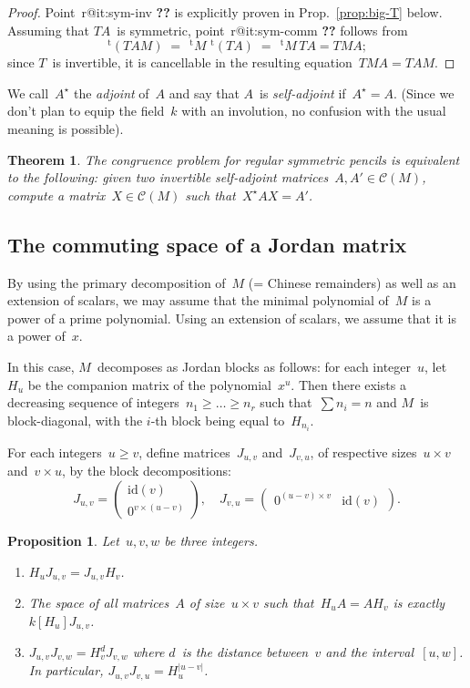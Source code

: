 \documentclass{article}%
\makeatletter
\newtheorem{prop}{Proposition}
\newtheorem{thm}{Theorem}
\def\labelenumi{(\roman{enumi})}
\def\itemref#1{\expandafter\ifx\csname r@#1\endcsname\relax
  {\bfseries ??}\else{\setcounter{enumi}{\ref{#1}}\labelenumi}\fi}
\let\ro\mathscr
\def\transpose{\,{}^{\mathrm{t}\!}}
\def\abs#1{\left|#1\right|}
\def\mat#1{\begin{pmatrix}#1\end{pmatrix}}
\makeatother
\begin{document}
\begin{proof}
Point~\itemref{it:sym-inv} is explicitly proven in Prop.~\ref{prop:big-T}
below. Assuming that $TA$~is symmetric, point~\itemref{it:sym-comm}
follows from
\begin{equation}
\transpose{(TAM)} \;=\; \transpose{M}\, \transpose{(TA)}
 \;=\; \transpose{M}\,TA = TMA;
\end{equation}
since $T$~is invertible, it is cancellable in the resulting equation~$TMA
= TAM$.
\end{proof}

We call~$A^{⋆}$ the \emph{adjoint} of~$A$ and say that $A$~is
\emph{self-adjoint} if~$A^{⋆} = A$. (Since we don't plan to equip the
field~$k$ with an involution, no confusion with the usual meaning is
possible).

\begin{thm}\label{thm:IP1S-congruence}
The congruence problem for regular symmetric pencils is equivalent to the
following: given two invertible self-adjoint matrices~$A, A' ∈ \ro C(M)$,
compute a matrix~$X ∈ \ro C(M)$ such that~$X^{⋆} A X = A'$.
\end{thm}

\subsection{The commuting space of a Jordan matrix}%

By using the primary decomposition of~$M$ (= Chinese remainders) as well
as an extension of scalars, we may assume that the minimal polynomial
of~$M$ is a power of a prime polynomial. Using an extension of scalars, we
assume that it is a power of~$x$.

In this case, $M$~decomposes as Jordan blocks as follows: for each
integer~$u$, let~$H_u$ be the companion matrix of the polynomial~$x^u$.
Then there exists a decreasing sequence of integers~$n_1 ≥ … ≥ n_r$ such
that~$∑ n_i = n$ and $M$~is block-diagonal, with the $i$-th block being
equal to~$H_{n_i}$.

For each integers~$u ≥ v$, define matrices~$J_{u,v}$ and~$J_{v,u}$, of
respective sizes~$u × v$ and~$v × u$, by the block decompositions:
\begin{equation}
J_{u,v} = \mat{ \mathrm{id}(v) \\ 0^{v ×(u-v)}},\quad
J_{v,u} = \mat{ 0^{(u-v)× v } & \mathrm{id}(v)}.
\end{equation}

\begin{prop}\label{prop:rel-HJ}
Let~$u, v, w$ be three integers.
\begin{enumerate}
\item $H_{u} J_{u,v} = J_{u,v} H_{v}$.
\item The space of all matrices~$A$ of size~$u × v$ such that~$H_u A = A
H_v$ is exactly $k[H_u] J_{u,v}$.
\item \label{it:Juw} $J_{u,v} J_{v,w} = H_v^{d} J_{v,w}^{}$ where $d$~is
the distance between~$v$ and the interval~$[u,w]$. In particular,
$J_{u,v} J_{v,u} = H_{u}^{\abs{u-v}}$.
\end{enumerate}
\end{prop}
\end{document}
